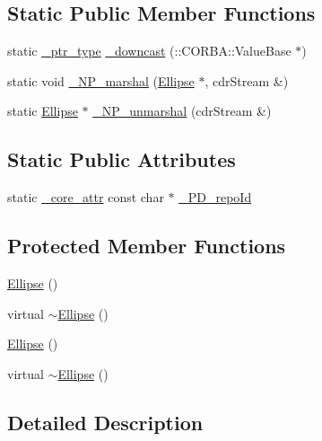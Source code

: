 \subsection*{Static Public Member Functions}
\begin{DoxyCompactItemize}
\item 
static \hyperlink{class_draw_a5164256572b3c4123ceecd1897c248dd}{\+\_\+ptr\+\_\+type} \hyperlink{class_ellipse_acbcf7089f6cceeee9bb7663221f94cfa}{\+\_\+downcast} (\+::C\+O\+R\+B\+A\+::\+Value\+Base $\ast$)
\item 
static void \hyperlink{class_ellipse_a7b86d2bf246fb67efe6b43220c7509d9}{\+\_\+\+N\+P\+\_\+marshal} (\hyperlink{class_ellipse}{Ellipse} $\ast$, cdr\+Stream \&)
\item 
static \hyperlink{class_ellipse}{Ellipse} $\ast$ \hyperlink{class_ellipse_a1c519c9754fc33d80898ed92b470770a}{\+\_\+\+N\+P\+\_\+unmarshal} (cdr\+Stream \&)
\end{DoxyCompactItemize}
\subsection*{Static Public Attributes}
\begin{DoxyCompactItemize}
\item 
static \hyperlink{_petit_prince_8hpp_a5f7bf7cddb608c2aad7c95f55f8a33c5}{\+\_\+core\+\_\+attr} const char $\ast$ \hyperlink{class_ellipse_a9d889330622bef63cd90c0f42e7ee344}{\+\_\+\+P\+D\+\_\+repo\+Id}
\end{DoxyCompactItemize}
\subsection*{Protected Member Functions}
\begin{DoxyCompactItemize}
\item 
\hyperlink{class_ellipse_aaff4917eddd8882616fe2f956151ba9b}{Ellipse} ()
\item 
virtual \hyperlink{class_ellipse_a5ab8160e6bf40ced81490d6d83d33d89}{$\sim$\+Ellipse} ()
\item 
\hyperlink{class_ellipse_aaff4917eddd8882616fe2f956151ba9b}{Ellipse} ()
\item 
virtual \hyperlink{class_ellipse_a5ab8160e6bf40ced81490d6d83d33d89}{$\sim$\+Ellipse} ()
\end{DoxyCompactItemize}


\subsection{Detailed Description}


